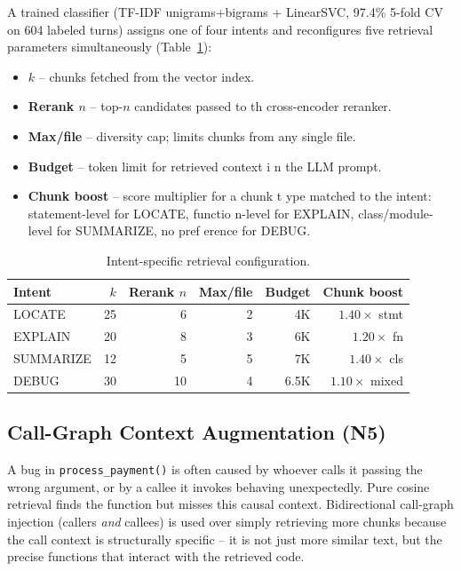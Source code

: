 \documentclass[conference]{IEEEtran}
\begin{document}
A trained classifier (TF-IDF unigrams+bigrams + LinearSVC, 97.4\% 5-fold
CV on 604 labeled turns) assigns one of four intents and reconfigures
five retrieval parameters simultaneously (Table~\ref{tab:intent_config}):
\begin{itemize}
       \item \textbf{$k$} -- chunks fetched from the vector index.
       \item \textbf{Rerank $n$} -- top-$n$ candidates passed to th
           cross-encoder reranker.
       \item \textbf{Max/file} -- diversity cap; limits chunks from
           any single file.
       \item \textbf{Budget} -- token limit for retrieved context i
          n the LLM prompt.
       \item \textbf{Chunk boost} -- score multiplier for a chunk t
          ype matched to the intent: statement-level for LOCATE, functio
          n-level for EXPLAIN, class/module-level for SUMMARIZE, no pref
          erence for DEBUG.
      \end{itemize}
\begin{table}[t]
\centering
\caption{Intent-specific retrieval configuration. }
\label{tab:intent_config}
\footnotesize
\begin{tabular}{lrrrrr}
\toprule
Intent & $k$ & Rerank $n$ & Max/file & Budget & Chunk boost \\
\midrule
LOCATE    & 25 & 6  & 2 & 4K  & $1.40\times$ stmt \\
EXPLAIN   & 20 & 8  & 3 & 6K  & $1.20\times$ fn  \\
SUMMARIZE & 12 & 5  & 5 & 7K  & $1.40\times$ cls \\
DEBUG     & 30 & 10 & 4 & 6.5K& $1.10\times$ mixed \\
\bottomrule
\end{tabular}
\end{table}

\subsection{Call-Graph Context Augmentation (N5)}

A bug in \texttt{process\_payment()} is often caused
by whoever calls it passing the wrong argument, or by a callee it invokes
behaving unexpectedly. Pure cosine retrieval finds the function but misses
this causal context. Bidirectional call-graph injection (callers
\emph{and} callees) is used over simply retrieving more chunks because the call
context is structurally specific -- it is not just more similar text, but
the precise functions that interact with the retrieved code.
\end{document}
